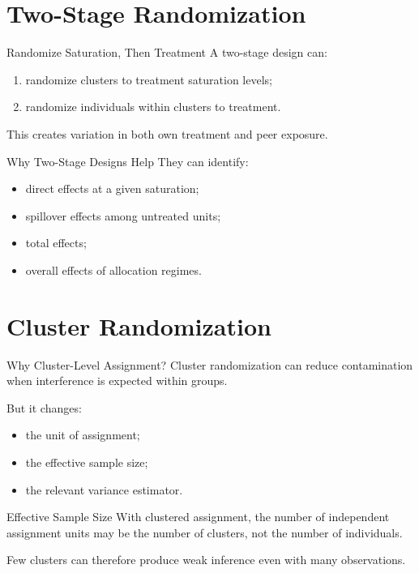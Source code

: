 \documentclass[aspectratio=169,11pt]{beamer}
\begin{document}
\section{Two-Stage Randomization}

\begin{frame}{Randomize Saturation, Then Treatment}
A two-stage design can:
\begin{enumerate}
\item randomize clusters to treatment saturation levels;
\item randomize individuals within clusters to treatment.
\end{enumerate}

This creates variation in both own treatment and peer exposure.
\end{frame}

\begin{frame}{Why Two-Stage Designs Help}
They can identify:
\begin{itemize}
\item direct effects at a given saturation;
\item spillover effects among untreated units;
\item total effects;
\item overall effects of allocation regimes.
\end{itemize}
\end{frame}

\section{Cluster Randomization}

\begin{frame}{Why Cluster-Level Assignment?}
Cluster randomization can reduce contamination when interference is expected within groups.

But it changes:
\begin{itemize}
\item the unit of assignment;
\item the effective sample size;
\item the relevant variance estimator.
\end{itemize}
\end{frame}

\begin{frame}{Effective Sample Size}
With clustered assignment, the number of independent assignment units may be the number of clusters, not the number of individuals.

Few clusters can therefore produce weak inference even with many observations.
\end{frame}
\end{document}
